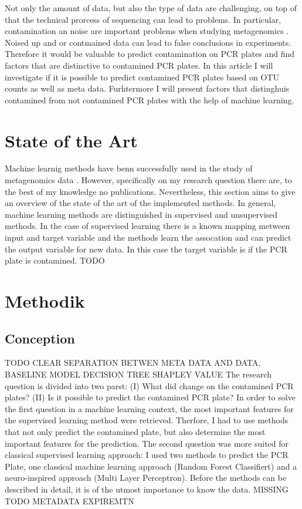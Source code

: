 \documentclass{svproc}
\begin{document}
Not only the amount of data, but also the type of data are challenging, on top of that the technical prorcess of sequencing can lead to problems.
In particular, contamination an noise are important problems when studying metagenomics \cite{paper Michel}. Noised up and or contmained data can lead to false conclusions in experiments. Therefore it would be valuable to predict contamination on PCR plates and find factors that are distinctive to contamined PCR plates. In this article I will investigate if it is possible to predict contamined PCR plates based on OTU counts as well as meta data. Furhtermore I will present factors that distinghuis contamined from not contamined PCR plates with the help of machine learning.


\section{State of the Art}
Machine learnig methods have benn successfully used in the study of metagenomics data  \cite{paperrunde}. However, specifically on my research question there are, to the best of my knowledge no publications. Nevertheless, this section aims to give an overview of the state of the art of the implemented methods. In general, machine learning methods are distinguished in supervised and unsupervised methods. In the case of supervised learning there is a known mapping metween input and target variable and the methods learn the assocation and can predict the output variable for new data. In this case the target variable is if the PCR plate is contamined.
TODO

 
%
%
\section{Methodik}
%
\subsection{Conception}
TODO CLEAR SEPARATION BETWEN META DATA AND DATA, BASELINE MODEL DECISION TREE SHAPLEY VALUE
The research question is divided into two parst: (I) What did change on the contamined PCR plates? (II) Is it possible to predict the contamined PCR plate?
In order to solve the first question in a machine learning context, the most important features for the supervised learning method were retrieved. Therfore, I had to use methods that not only predict the contamined plate, but also determine the most important features for the prediction. The second question was more suited for classical supervised learning approach: I used two methods to predict the PCR Plate, one classical machine learning approach (Random Forest Classifiert) and a neuro-inspired approach (Multi Layer Perceptron). Before the methods can be described in detail, it is of the utmost importance to know the data.
 MISSING TODO METADATA EXPIREMTN
\end{document}
